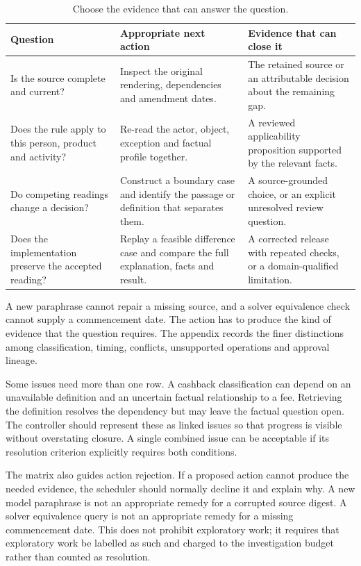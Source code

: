 \begin{table}[htbp]
\centering
\caption{Choose the evidence that can answer the question.}
\label{tab:resolution-matrix}
\begin{tabularx}{\textwidth}{P{38mm}P{57mm}Y}
\toprule
Question & Appropriate next action & Evidence that can close it\\
\midrule
Is the source complete and current? & Inspect the original rendering, dependencies and amendment dates. & The retained source or an attributable decision about the remaining gap.\\
Does the rule apply to this person, product and activity? & Re-read the actor, object, exception and factual profile together. & A reviewed applicability proposition supported by the relevant facts.\\
Do competing readings change a decision? & Construct a boundary case and identify the passage or definition that separates them. & A source-grounded choice, or an explicit unresolved review question.\\
Does the implementation preserve the accepted reading? & Replay a feasible difference case and compare the full explanation, facts and result. & A corrected release with repeated checks, or a domain-qualified limitation.\\
\bottomrule
\end{tabularx}
\end{table}

A new paraphrase cannot repair a missing source, and a solver equivalence check
cannot supply a commencement date. The action has to produce the kind of evidence
that the question requires. The appendix records the finer distinctions among
classification, timing, conflicts, unsupported operations and approval lineage.


Some issues need more than one row. A cashback classification can depend on an
unavailable definition and an uncertain factual relationship to a fee. Retrieving
the definition resolves the dependency but may leave the factual question open.
The controller should represent these as linked issues so that progress is visible
without overstating closure. A single combined issue can be acceptable if its
resolution criterion explicitly requires both conditions.

The matrix also guides action rejection. If a proposed action cannot produce the
needed evidence, the scheduler should normally decline it and explain why. A new
model paraphrase is not an appropriate remedy for a corrupted source digest. A
solver equivalence query is not an appropriate remedy for a missing commencement
date. This does not prohibit exploratory work; it requires that exploratory work
be labelled as such and charged to the investigation budget rather than counted
as resolution.

